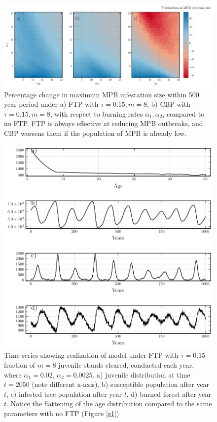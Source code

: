 \begin{figure}
  \includegraphics[width=\textwidth]{chapter_3/a1_a2_trim_gain.pdf}
  \caption{Percentage change in maximum MPB infestation size within 500 year period under a) FTP with $\tau = 0.15, m = 8$, b) CBP with $\tau = 0.15, m = 8$,  with respect to burning rates $\alpha_1,\alpha_2$, compared to no FTP. FTP is always effective at reducing MPB outbreaks, and CBP worsens them if the population of MPB is already low.}
  \label{trim_gain}
\end{figure}
\begin{figure}
  \includegraphics[width=\textwidth]{chapter_3/z1_ftp.pdf}
  \caption{Time series showing realization of model under FTP with $\tau = 0.15$ fraction of $m = 8$ juvenile stands cleared, conducted each year, where  $\alpha_1 = 0.02$, $\alpha_2 = 0.0025$.  a) juvenile distribution at time $t=2050$ (note different x-axis), b) susceptible population after year $t$, c) infested tree population after year $t$, d) burned forest after year $t$.  Notice the flattening of the age distribution compared to the same parameters with no FTP (Figure \ref{z1})}
  \label{trim_ts}
\end{figure}

